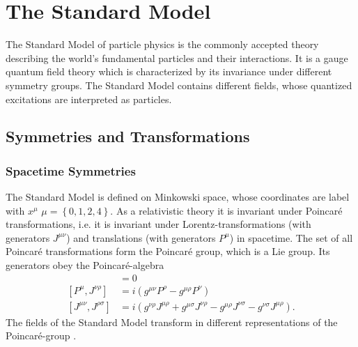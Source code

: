 \section{The Standard Model}
The Standard Model of particle physics is the commonly accepted theory describing the world's fundamental particles and their interactions. It is a gauge quantum field theory which is characterized by its invariance under different symmetry groups. The Standard Model contains different fields, whose quantized excitations are interpreted as particles.\\


\subsection{Symmetries and Transformations}
\subsubsection*{Spacetime Symmetries}
The Standard Model is defined on Minkowski space, whose coordinates are label with $x^\mu$ $\mu = \left\{0,1,2,4\right\}$. As a relativistic theory it is invariant under Poincaré transformations, i.e. it is invariant under Lorentz-transformations (with generators $J^{\mu\nu}$) and translations (with generators $P^\mu$) in spacetime. The set of all Poincaré transformations form the Poincaré group, which is a Lie group. Its generators obey the Poincaré-algebra
\begin{align}
[P^\mu,P^\nu] &= 0\nonumber\\
[P^\mu,J^{\nu\rho}] &= i(g^{\mu\nu} P^\rho - g^{\mu\rho}P^\nu)\nonumber\\
[J^{\mu\nu},J^{\rho\sigma}] &= i(g^{\nu\rho}J^{\mu\rho} + g^{\mu\sigma}J^{\nu\rho} - g^{\mu\rho}J^{\nu\sigma} - g^{\nu\sigma}J^{\mu\rho}).
\end{align}
The fields of the Standard Model transform in different representations of the Poincaré-group \cite{book:17018}. 


